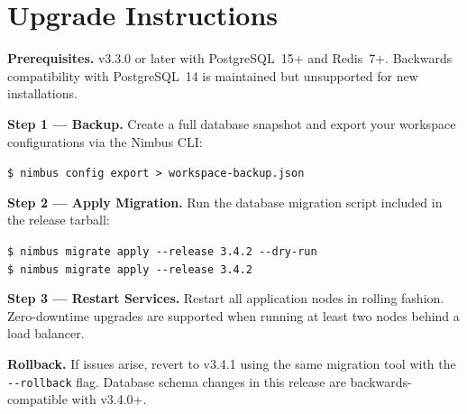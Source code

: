 \section{\faDownload\hspace{6pt}Upgrade Instructions}

\begin{releasebox}
  \small

  \textbf{Prerequisites.} v3.3.0 or later with PostgreSQL~15+ and Redis~7+.
  Backwards compatibility with PostgreSQL~14 is maintained but unsupported
  for new installations.

  \vspace{6pt}
  \textbf{Step 1 --- Backup.} Create a full database snapshot and export
  your workspace configurations via the Nimbus CLI:

  \texttt{\$ nimbus config export > workspace-backup.json}

  \vspace{6pt}
  \textbf{Step 2 --- Apply Migration.} Run the database migration script
  included in the release tarball:

  \texttt{\$ nimbus migrate apply -{}-release 3.4.2 -{}-dry-run}\\[2pt]
  \texttt{\$ nimbus migrate apply -{}-release 3.4.2}

  \vspace{6pt}
  \textbf{Step 3 --- Restart Services.} Restart all application nodes in
  rolling fashion. Zero-downtime upgrades are supported when running at least
  two nodes behind a load balancer.

  \vspace{6pt}
  \textbf{Rollback.} If issues arise, revert to v3.4.1 using the same
  migration tool with the \texttt{-{}-rollback} flag. Database schema changes
  in this release are backwards-compatible with v3.4.0+.

  \vspace{8pt}
  \begin{center}
  \end{center}
\end{releasebox}
